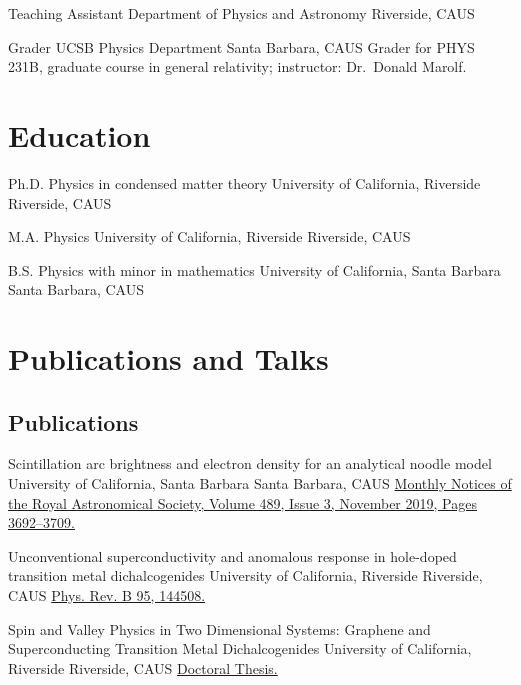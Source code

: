 \documentclass[10pt,letter]{moderncv}
\begin{document}
    {Teaching Assistant}
    {Department of Physics and Astronomy}
    {Riverside, CA}{US}{}

    {Grader}
    {UCSB Physics Department}
    {Santa Barbara, CA}{US}
    {Grader for PHYS 231B, graduate course in general relativity; instructor: Dr.~Donald Marolf.}

  \section{Education}

    {Ph.D. Physics in condensed matter theory}
    {University of California, Riverside}
    {Riverside, CA}{US}{}

    {M.A. Physics}
    {University of California, Riverside}
    {Riverside, CA}{US}{}

    {B.S. Physics with minor in mathematics}
    {University of California, Santa Barbara}
    {Santa Barbara, CA}{US}{}

  \section{Publications and Talks}

  \subsection{Publications}

    {Scintillation arc brightness and electron density for an analytical noodle model}
    {University of California, Santa Barbara}
    {Santa Barbara, CA}{US}
    {\href{https://arxiv.org/abs/1908.00095}
      {Monthly Notices of the Royal Astronomical Society, Volume 489, Issue 3, November 2019, Pages 3692–3709.}}

    {Unconventional superconductivity and anomalous response in hole-doped transition metal dichalcogenides}
    {University of California, Riverside}
    {Riverside, CA}{US}
    {\href{https://journals.aps.org/prb/abstract/10.1103/PhysRevB.95.144508}
      {Phys. Rev. B 95, 144508.}}

    {Spin and Valley Physics in Two Dimensional Systems: Graphene and Superconducting Transition Metal Dichalcogenides}
    {University of California, Riverside}
    {Riverside, CA}{US}
    {\href{https://escholarship.org/uc/item/4941w4t0}
      {Doctoral Thesis.}}
\end{document}
